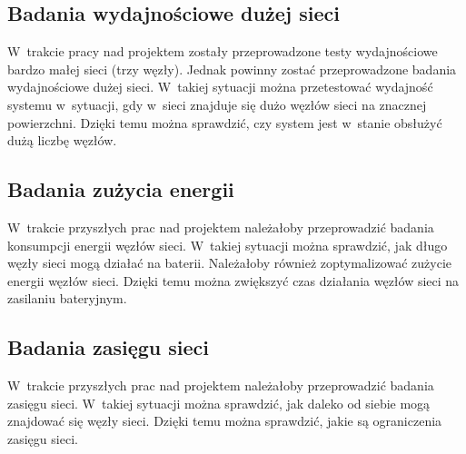 \subsection{Badania wydajnościowe dużej sieci}
W~trakcie pracy nad projektem zostały przeprowadzone testy wydajnościowe bardzo małej sieci (trzy węzły).
Jednak powinny zostać przeprowadzone badania wydajnościowe dużej sieci.
W~takiej sytuacji można przetestować wydajność systemu w~sytuacji, gdy w~sieci znajduje się dużo węzłów sieci na znacznej powierzchni.
Dzięki temu można sprawdzić, czy system jest w~stanie obsłużyć dużą liczbę węzłów.

\subsection{Badania zużycia energii}
W~trakcie przyszłych prac nad projektem należałoby przeprowadzić badania konsumpcji energii węzłów sieci.
W~takiej sytuacji można sprawdzić, jak długo węzły sieci mogą działać na baterii.
Należałoby również zoptymalizować zużycie energii węzłów sieci.
Dzięki temu można zwiększyć czas działania węzłów sieci na zasilaniu bateryjnym.

\subsection{Badania zasięgu sieci}
W~trakcie przyszłych prac nad projektem należałoby przeprowadzić badania zasięgu sieci.
W~takiej sytuacji można sprawdzić, jak daleko od siebie mogą znajdować się węzły sieci.
Dzięki temu można sprawdzić, jakie są ograniczenia zasięgu sieci.
